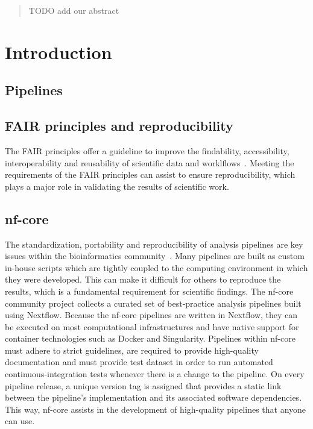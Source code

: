 \documentclass{article}
\theoremstyle{plain}
\theoremstyle{definition}
\theoremstyle{remark}
\begin{document}
\begin{abstract}
TODO add our abstract
\end{abstract}

%

\section{Introduction}
\subsection{Pipelines}
\subsection{FAIR principles and reproducibility}
The FAIR principles offer a guideline to improve the findability, accessibility, interoperability and reusability of scientific data and worklflows~\cite{wilkinson2016fair}. 
Meeting the requirements of the FAIR principles can assist to ensure reproducibility, which plays a major role in validating the results of scientific work.
\subsection{nf-core}
The standardization, portability and reproducibility of analysis pipelines are key issues within the bioinformatics community~\cite{ewels2020nf}. Many pipelines are built as custom in-house scripts which are tightly coupled to the computing environment in which they were developed. This can make it difficult for others to reproduce the results, which is a fundamental requirement for scientific findings. The nf-core community project collects a curated set of best-practice analysis pipelines built using Nextflow. Because the nf-core pipelines are written in Nextflow, they can be executed on most computational infrastructures and have native support for container technologies such as Docker and Singularity. Pipelines within nf-core must adhere to strict guidelines, are required to provide high-quality documentation and must provide test dataset in order to run automated continuous-integration tests whenever there is a change to the pipeline. On every pipeline release, a unique version tag is assigned that provides a static link between the pipeline’s implementation and its associated software dependencies. This way, nf-core assists in the development of high-quality pipelines that anyone can use.
\end{document}
